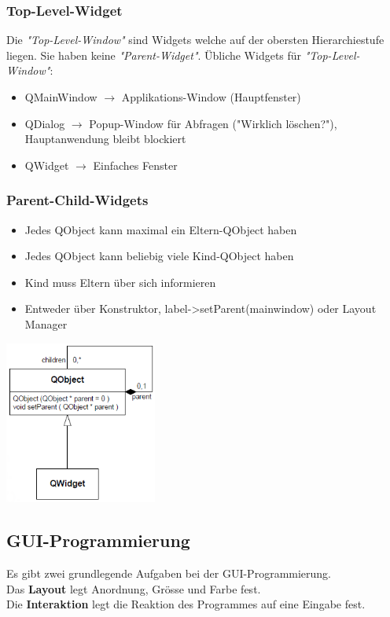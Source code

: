 \begin{multicols}{3}
\subsubsection{Top-Level-Widget}
Die \textit{"Top-Level-Window"} sind Widgets welche auf der obersten Hierarchiestufe liegen. Sie haben keine \textit{"Parent-Widget"}.\newline
Übliche Widgets für \textit{"Top-Level-Window"}: 
\begin{itemize}
	\item QMainWindow $\rightarrow$ Applikations-Window (Hauptfenster)
	\item QDialog $\rightarrow$ Popup-Window für Abfragen ("Wirklich löschen?"), Hauptanwendung bleibt blockiert
	\item QWidget $\rightarrow$ Einfaches Fenster
\end{itemize}

\subsubsection{Parent-Child-Widgets}
\begin{itemize}
	\item Jedes QObject kann maximal ein Eltern-QObject haben
	\item Jedes QObject kann beliebig viele \newline Kind-QObject haben
	\item Kind muss Eltern über sich informieren
	\item Entweder über Konstruktor, \newline label->setParent(mainwindow) oder Layout Manager
\end{itemize}

\includegraphics[width=5cm]{images/qt_parent_child.png}
\end{multicols}

\subsection{GUI-Programmierung}
Es gibt zwei grundlegende Aufgaben bei der GUI-Programmierung.\\
Das \textbf{Layout} legt Anordnung, Grösse  und Farbe fest.\\
Die \textbf{Interaktion} legt die Reaktion des Programmes auf eine Eingabe fest. \\

